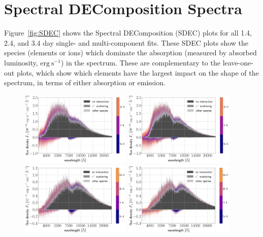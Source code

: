 \documentclass[twocolumn, twocolappendix]{aastex63}
\begin{document}
\section{Spectral DEComposition Spectra}\label{app:SDEC}

Figure~\ref{fig:SDEC} shows the Spectral DEComposition (SDEC) plots for all 1.4, 2.4, and 3.4 day single- and multi-component fits. These SDEC plots show the species (elements or ions) which dominate the absorption (measured by absorbed luminosity, $\mathrm{erg~s^{-1}}$) in the spectrum. These are complementary to the leave-one-out plots, which show which elements have the largest impact on the shape of the spectrum, in terms of either absorption or emission.

\begin{figure}[!ht]
    \centering
    \includegraphics[width=0.47\textwidth]{figs/appendix/SDEC/230704_165812_single_TARDIS_eval_SDEC.png}
    \includegraphics[width=0.47\textwidth]{figs/appendix/SDEC/230412_040127_single_TARDIS_eval_SDEC.png}
    \includegraphics[width=0.47\textwidth]{figs/appendix/SDEC/221024_080947_single_TARDIS_eval_SDEC.png}
    \includegraphics[width=0.47\textwidth]{figs/appendix/SDEC/230412_035244_single_TARDIS_eval_SDEC.png}

\end{figure}
\end{document}
